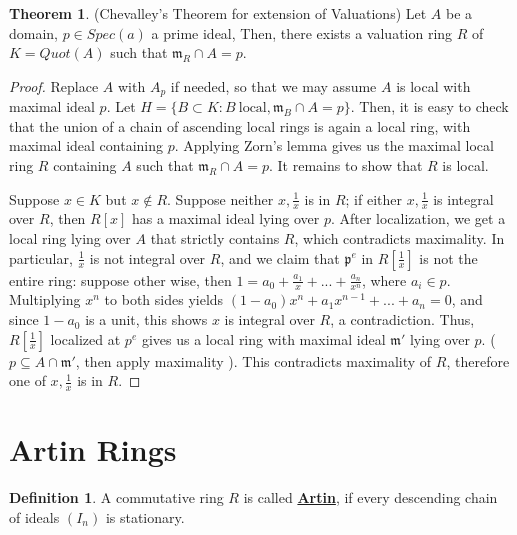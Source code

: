 \documentclass{article}
\theoremstyle{definition}
\newtheorem{theorem}{Theorem}[section]
\theoremstyle{definition}
\theoremstyle{definition}
\theoremstyle{definition}
\theoremstyle{definition}
\newtheorem{definition}{Definition}[section]
\theoremstyle{definition}
\theoremstyle{definition}
\begin{document}
\begin{tcolorbox}[colback=red!5!white,colframe=red!30!white]
\begin{theorem}
(Chevalley's Theorem for extension of Valuations) Let $A$ be a domain, $p\in Spec(a)$ a prime ideal, Then, there exists a valuation ring $R$ of $K=Quot(A)$ such that $\mathfrak{m}_R\cap A=p$. 
\end{theorem}
\end{tcolorbox}
\begin{proof}
     Replace $A$ with $A_p$ if needed, so that we may assume $A$ is local with maximal ideal $p$. Let $H=\{ B\subset K: B \ \textrm{local}, \mathfrak{m}_B\cap A=p \}$. Then, it is easy to check that the union of a chain of ascending local rings is again a local ring, with maximal ideal containing $p$. Applying Zorn's lemma gives us the maximal local ring $R$ containing $A$ such that $\mathfrak{m}_R\cap A=p$. It remains to show that $R$ is local. 
     
     Suppose $x\in K$ but $x\not \in R$. Suppose neither $x,\frac{1}{x}$ is in $R$; if either $x,\frac{1}{x}$ is integral over $R$, then $R[x]$ has a maximal ideal lying over $p$. After localization, we get a local ring lying over $A$ that strictly contains $R$, which contradicts maximality. In particular, $\frac{1}{x}$ is not integral over $R$, and we claim that $\mathfrak{p}^e$ in $R[\frac{1}{x}]$ is not the entire ring: suppose other wise, then $1=a_0+\frac{a_1}{x}+...+\frac{a_n}{x^n}$, where $a_i\in p$. Multiplying $x^n$ to both sides yields $(1-a_0)x^n+a_1x^{n-1}+...+a_n=0$, and since $1-a_0$ is a unit, this shows $x$ is integral over $R$, a contradiction. Thus, $R[\frac{1}{x}]$ localized at $p^e$ gives us a local ring with maximal ideal $\mathfrak{m}'$ lying over $p$. ($p\subseteq A\cap \mathfrak{m}'$, then apply maximality ). This contradicts maximality of $R$, therefore one of $x,\frac{1}{x}$ is in $R$. 
\end{proof}

\section{Artin Rings}

\begin{tcolorbox}[colback=purple!5!white,colframe=purple!75!black]
\begin{definition}
A commutative ring $R$ is called \underline{\textbf{Artin}}, if every descending chain of ideals $(I_n)$ is stationary. 
\end{definition}
\end{tcolorbox}
\end{document}
